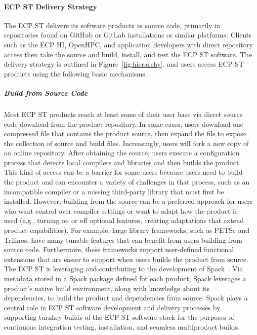 \paragraph{ECP ST Delivery Strategy}
The ECP ST delivers its software products as source code, primarily in repositories found on GitHub or GitLab installations or similar platforms. Clients such as the ECP HI, OpenHPC, and application developers with direct repository access then take the source and build, install, and test the ECP ST software. The delivery strategy is outlined in Figure~\ref{fig:hierarchy}, and  
%
users access ECP ST products using the following basic mechanisms.



	\subparagraph{Build from Source Code} Most ECP ST products reach at least some of their user base via direct source code download from the product repository.  In some cases, users download one compressed file that contains the product source, then expand the file to expose the collection of source and build files.  Increasingly, users will fork a new copy of an online repository.  After obtaining the source, users execute a configuration process that detects local compilers and libraries and then builds the product.  This kind of access can be a barrier for some users because users need to build the product and can encounter a variety of challenges in that process, such as an incompatible compiler or a missing third-party library that must first be installed.  However, building from the source can be a preferred approach for users who want control over compiler settings or want to adapt how the product is used (e.g., turning on or off optional features, creating adaptations that extend product capabilities). For example, large library frameworks, such as PETSc and Trilinos, have many tunable features that can benefit from users building from source code.  Furthermore, these frameworks support user-defined functional extensions that are easier to support when users builds the product from source. The ECP ST is leveraging and contributing to the development of Spack~\cite{gamblin+:sc15}.  Via metadata stored in a Spack package defined for each product, Spack leverages a product's native build environment, along with knowledge about its dependencies, to build the product and dependencies from source.  Spack plays a central role in ECP ST software development and delivery processes by supporting turnkey builds of the ECP ST software stack for the purposes of continuous integration testing, installation, and seamless multiproduct builds.
